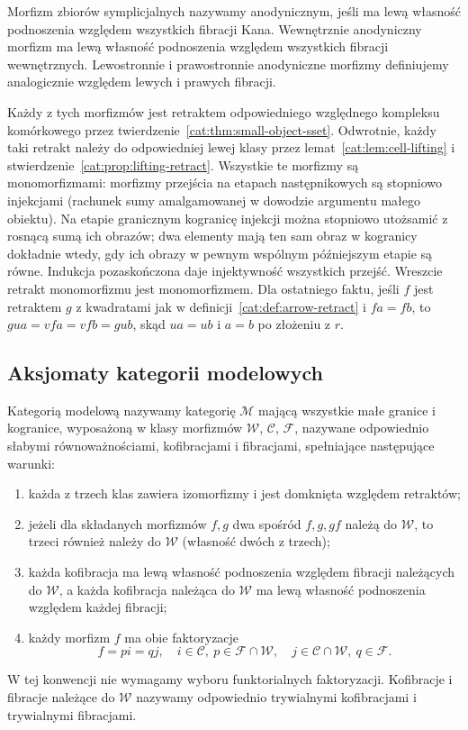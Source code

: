 \begin{definicja}\label{cat:def:anodyne}
Morfizm zbiorów symplicjalnych nazywamy anodynicznym, jeśli ma lewą własność podnoszenia względem wszystkich fibracji Kana. Wewnętrznie anodyniczny morfizm ma lewą własność podnoszenia względem wszystkich fibracji wewnętrznych. Lewostronnie i prawostronnie anodyniczne morfizmy definiujemy analogicznie względem lewych i prawych fibracji.
\end{definicja}
Każdy z tych morfizmów jest retraktem odpowiedniego względnego kompleksu komórkowego przez twierdzenie~\ref{cat:thm:small-object-sset}. Odwrotnie, każdy taki retrakt należy do odpowiedniej lewej klasy przez lemat~\ref{cat:lem:cell-lifting} i stwierdzenie~\ref{cat:prop:lifting-retract}. Wszystkie te morfizmy są monomorfizmami: morfizmy przejścia na etapach następnikowych są stopniowo injekcjami (rachunek sumy amalgamowanej w dowodzie argumentu małego obiektu). Na etapie granicznym kogranicę injekcji można stopniowo utożsamić z rosnącą sumą ich obrazów; dwa elementy mają ten sam obraz w kogranicy dokładnie wtedy, gdy ich obrazy w pewnym wspólnym późniejszym etapie są równe. Indukcja pozaskończona daje injektywność wszystkich przejść. Wreszcie retrakt monomorfizmu jest monomorfizmem. Dla ostatniego faktu, jeśli $f$ jest retraktem $g$ z kwadratami jak w definicji~\ref{cat:def:arrow-retract} i $fa=fb$, to $gua=vfa=vfb=gub$, skąd $ua=ub$ i $a=b$ po złożeniu z $r$.

\subsection{Aksjomaty kategorii modelowych}

\begin{definicja}\label{cat:def:model-category}
Kategorią modelową nazywamy kategorię $\mathcal M$ mającą wszystkie małe granice i kogranice, wyposażoną w klasy morfizmów $\mathcal W$, $\mathcal C$, $\mathcal F$, nazywane odpowiednio słabymi równoważnościami, kofibracjami i fibracjami, spełniające następujące warunki:
\begin{enumerate}
 \item każda z trzech klas zawiera izomorfizmy i jest domknięta względem retraktów;
 \item jeżeli dla składanych morfizmów $f,g$ dwa spośród $f,g,gf$ należą do $\mathcal W$, to trzeci również należy do $\mathcal W$ (własność dwóch z trzech);
 \item każda kofibracja ma lewą własność podnoszenia względem fibracji należących do $\mathcal W$, a każda kofibracja należąca do $\mathcal W$ ma lewą własność podnoszenia względem każdej fibracji;
 \item każdy morfizm $f$ ma obie faktoryzacje
 \[
 f=pi=qj,\quad
 i\in\mathcal C,\ p\in\mathcal F\cap\mathcal W,\quad
 j\in\mathcal C\cap\mathcal W,\ q\in\mathcal F.
 \]
\end{enumerate}
W tej konwencji nie wymagamy wyboru funktorialnych faktoryzacji. Kofibracje i fibracje należące do $\mathcal W$ nazywamy odpowiednio trywialnymi kofibracjami i trywialnymi fibracjami.
\end{definicja}

